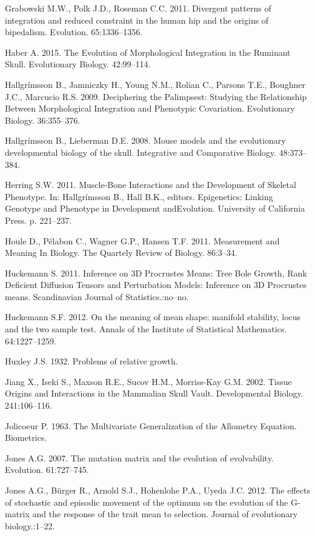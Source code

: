 \documentclass[12pt,]{article}
\begin{document}
Grabowski M.W., Polk J.D., Roseman C.C. 2011. Divergent patterns of
integration and reduced constraint in the human hip and the origins of
bipedalism. Evolution. 65:1336--1356.

Haber A. 2015. The Evolution of Morphological Integration in the
Ruminant Skull. Evolutionary Biology. 42:99--114.

Hallgrímsson B., Jamniczky H., Young N.M., Rolian C., Parsons T.E.,
Boughner J.C., Marcucio R.S. 2009. Deciphering the Palimpsest: Studying
the Relationship Between Morphological Integration and Phenotypic
Covariation. Evolutionary Biology. 36:355--376.

Hallgrímsson B., Lieberman D.E. 2008. Mouse models and the evolutionary
developmental biology of the skull. Integrative and Comparative Biology.
48:373--384.

Herring S.W. 2011. Muscle-Bone Interactions and the Development of
Skeletal Phenotype. In: Hallgrímsson B., Hall B.K., editors.
Epigenetics: Linking Genotype and Phenotype in Development andEvolution.
University of California Press. p. 221--237.

Houle D., Pélabon C., Wagner G.P., Hansen T.F. 2011. Measurement and
Meaning In Biology. The Quartely Review of Biology. 86:3--34.

Huckemann S. 2011. Inference on 3D Procrustes Means: Tree Bole Growth,
Rank Deficient Diffusion Tensors and Perturbation Models: Inference on
3D Procrustes means. Scandinavian Journal of Statistics.:no--no.

Huckemann S.F. 2012. On the meaning of mean shape: manifold stability,
locus and the two sample test. Annals of the Institute of Statistical
Mathematics. 64:1227--1259.

Huxley J.S. 1932. Problems of relative growth.

Jiang X., Iseki S., Maxson R.E., Sucov H.M., Morriss-Kay G.M. 2002.
Tissue Origins and Interactions in the Mammalian Skull Vault.
Developmental Biology. 241:106--116.

Jolicoeur P. 1963. The Multivariate Generalization of the Allometry
Equation. Biometrics.

Jones A.G. 2007. The mutation matrix and the evolution of evolvability.
Evolution. 61:727--745.

Jones A.G., Bürger R., Arnold S.J., Hohenlohe P.A., Uyeda J.C. 2012. The
effects of stochastic and episodic movement of the optimum on the
evolution of the G-matrix and the response of the trait mean to
selection. Journal of evolutionary biology.:1--22.
\end{document}
